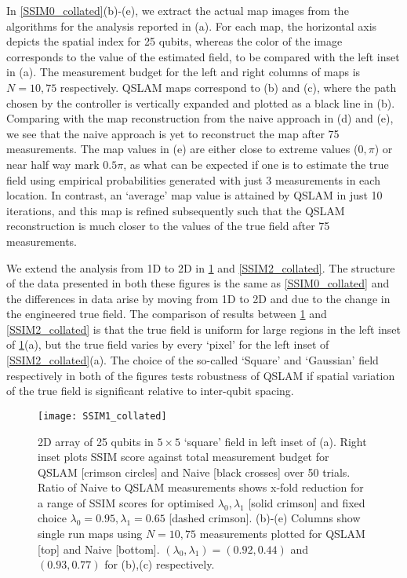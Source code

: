 In \cref{SSIM0_collated}(b)-(e), we extract the actual map images from the algorithms for the analysis reported in (a). For each map, the horizontal axis depicts the spatial index for 25 qubits, whereas the color of the image corresponds to the value of the estimated field, to be compared with the left inset in (a). The measurement budget for the left and right columns of maps is $N=10, 75$ respectively. QSLAM maps correspond to (b) and (c), where the path chosen by the controller is vertically expanded and plotted as a black line in (b). Comparing with the map reconstruction from the naive approach in (d) and (e), we see that the naive approach is yet to reconstruct the map after 75 measurements. The map values in (e) are either close to extreme values ($0, \pi$) or near half way mark $0.5\pi$, as what can be expected if one is to estimate the true field using empirical probabilities generated with just $3$ measurements in each location. In contrast, an `average' map value is attained by QSLAM in just 10 iterations, and this map is refined subsequently such that the QSLAM reconstruction is much closer to the values of the true field after 75 measurements. 

We extend the analysis from 1D to 2D in \cref{SSIM1_collated} and \cref{SSIM2_collated}. The structure of the data presented in both these figures is the same as \cref{SSIM0_collated} and the differences in data arise by moving from 1D to 2D and due to the change in the engineered true field. The comparison of results between \cref{SSIM1_collated} and \cref{SSIM2_collated} is that the true field is uniform for large regions in  the left inset of \cref{SSIM1_collated}(a), but the true field varies by every `pixel' for the left inset of \cref{SSIM2_collated}(a). The choice of the so-called `Square' and `Gaussian' field respectively in both of the figures tests robustness of QSLAM if spatial variation of the true field is significant relative to inter-qubit spacing. 
\begin{figure}
	\texttt{[image: SSIM1\_collated]}
	\caption{\label{SSIM1_collated} 2D array of 25 qubits in $5 \times 5$  `square' field in left inset of (a).  Right inset plots SSIM score against total measurement budget for QSLAM [crimson circles] and Naive [black crosses] over 50 trials. Ratio of Naive to QSLAM measurements shows x-fold reduction for a range of SSIM scores for optimised $\lambda_0, \lambda_1$ [solid crimson] and fixed choice $\lambda_0 = 0.95, \lambda_1 = 0.65$ [dashed crimson]. (b)-(e) Columns show single run maps using $N=10, 75$ measurements plotted for QSLAM [top] and Naive [bottom]. $(\lambda_0, \lambda_1)= (0.92, 0.44)$ and $ (0.93, 0.77)$ for (b),(c) respectively.}    	
\end{figure} 

